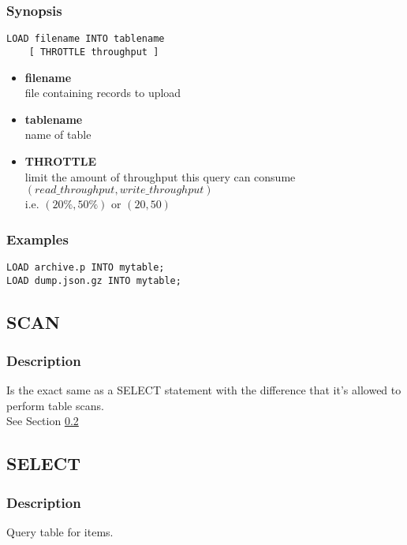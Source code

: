 \subsubsection{Synopsis}
\lstset{language=Java}
\begin{lstlisting}
LOAD filename INTO tablename
    [ THROTTLE throughput ]	
\end{lstlisting}

\begin{itemize}
	\item \textbf{filename} \\
	file containing records to upload
	\item \textbf{tablename} \\
	name of table
	\item \textbf{THROTTLE} \\
	limit the amount of throughput this query can consume\\
	$(read\_throughput, write\_throughput)$\\
	i.e. $(20\%, 50\%)$ or $(20, 50)$
\end{itemize}

\subsubsection{Examples}
\lstset{language=Java}
\begin{lstlisting}
LOAD archive.p INTO mytable;
LOAD dump.json.gz INTO mytable;	
\end{lstlisting}
\vspace{40pt}

\subsection{SCAN}
\subsubsection{Description}
Is the exact same as a SELECT statement with the difference that it's allowed to perform table scans.\\
See Section \ref{sssec:select}


\subsection{SELECT}
\label{sssec:select}
\subsubsection{Description}
Query table for items.

